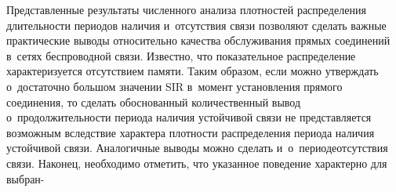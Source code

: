 \begin{multicols}{2}
  
  Представленные результаты численного анализа плотностей распределения 
длительности периодов наличия и~отсутствия связи позволяют сделать важные 
практические выводы относительно качества обслуживания прямых 
соединений в~сетях беспроводной связи. Известно, что показательное %
распределение характеризуется отсутствием памяти. Таким образом, если 
можно утверждать о~достаточ\-но большом значении SIR в~момент 
установления прямого соединения, то сделать обоснованный количественный 
вывод о~продолжительности периода наличия устойчивой связи не 
представляется возможным вследствие характера плотности распределения 
периода наличия устойчивой связи. Аналогичные выводы можно сделать 
и~о~периоде\linebreak отсутствия связи. Наконец, необходимо отметить, что указанное 
поведение характерно для выбран-\linebreak\vspace*{-12pt}

\pagebreak

\end{multicols}

\begin{figure*} %
\vspace*{1pt}
\begin{center}
\mbox{%
\epsfxsize=161.511mm
}
\end{center}
\vspace*{-9pt}
  \vspace*{6pt}
\begin{center}
\mbox{%
\epsfxsize=161.632mm
}
\end{center}
\vspace*{-9pt}
\end{figure*}

